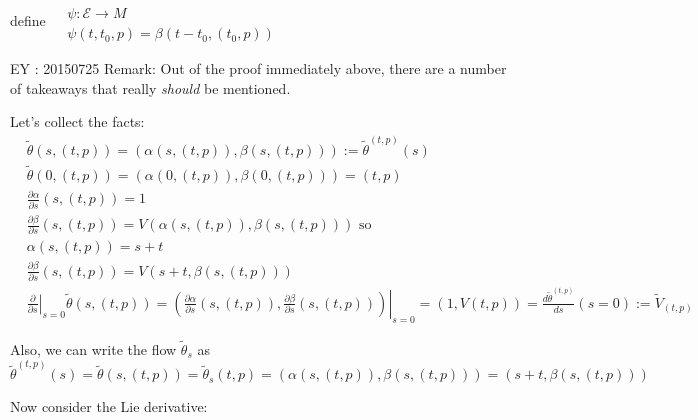 define $\begin{aligned} & \quad \\ 
  & \psi : \mathcal{E} \to M \\
  & \psi(t,t_0,p) = \beta(t-t_0,(t_0,p))
\end{aligned}$

EY : 20150725 Remark: Out of the proof immediately above, there are a number of takeaways that really \emph{should} be mentioned.  

Let's collect the facts:
\[
\begin{aligned}
  & \widetilde{\theta}(s,(t,p)) = (\alpha(s,(t,p)), \beta(s,(t,p)) ) := \widetilde{\theta}^{(t,p)}(s) \\ 
  & \widetilde{\theta}(0,(t,p)) = (\alpha(0,(t,p)), \beta(0,(t,p)) ) = (t,p) \\ 
  & \frac{ \partial \alpha}{ \partial s}(s,(t,p)) = 1 \\
  & \frac{ \partial \beta }{ \partial s}(s,(t,p)) = V(\alpha(s,(t,p)), \beta(s,(t,p))) \text{ so } \\ 
  & \alpha(s,(t,p)) = s+t \\ 
  & \frac{ \partial \beta}{ \partial s}(s,(t,p)) = V(s+t,\beta(s,(t,p)) ) \\
  & \left. \frac{ \partial }{ \partial s} \right|_{s=0} \widetilde{\theta}(s,(t,p)) = \left. \left( \frac{ \partial \alpha }{ \partial s}(s,(t,p)) , \frac{ \partial \beta}{ \partial s}(s,(t,p)) \right) \right|_{s=0} = (1,V(t,p)) = \frac{d\widetilde{\theta}^{(t,p)}}{ds}(s=0) := \widetilde{V}_{(t,p)}
\end{aligned}
\]

Also, we can write the flow $\widetilde{\theta}_s$ as
\[
\widetilde{\theta}^{(t,p)}(s) = \widetilde{\theta}(s,(t,p)) = \widetilde{\theta}_s(t,p) = (\alpha(s,(t,p)),\beta(s,(t,p))) = (s+t, \beta(s,(t,p)))
\]

Now consider the Lie derivative:

